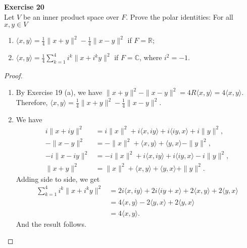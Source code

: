 \documentclass[12pt, a4paper]{article}
\theoremstyle{plain}
\newcommand{\R}{\mathbb{R}}
\newcommand{\C}{\mathbb{C}}
\newenvironment{exercise}[2][Exercise]
    { \begin{mdframed}[backgroundcolor=gray!20] \textbf{#1 #2} \\}
    {  \end{mdframed}}
\begin{document}
\begin{exercise}{20}
Let $V$ be an inner product space over $F$. Prove the polar identities: For all $x,y\in V$
\begin{enumerate}[label=(\alph*)]
\item $\langle{x,y}\rangle=\frac{1}{4}\|x+y\|^2-\frac{1}{4}\|x-y\|^2$ if $F=\R$;
\item $\langle{x,y}\rangle=\frac{1}{4}\sum_{k=1}^{4}{i^k\|x+i^ky\|^2}$ if $F=\C$, where $i^2=-1$.
\end{enumerate}
\end{exercise}
	\begin{proof}
	\hfill
	\begin{enumerate}[label=(\alph*)]
	\item By Exercise 19 (a), we have $\|x+y\|^2-\|x-y\|^2=4R\langle{x,y}\rangle=4\langle{x,y}\rangle$. Therefore, $\langle{x,y}\rangle=\frac{1}{4}\|x+y\|^2-\frac{1}{4}\|x-y\|^2$.
	\item We have 
	\begin{align*}
	i\|x+iy\|^2&=i\|x\|^2+i\langle{x,iy}\rangle+i\langle{iy,x}\rangle+i\|y\|^2,\\
	-\|x-y\|^2&=-\|x\|^2+\langle{x,y}\rangle+\langle{y,x}\rangle-\|y\|^2,\\
	-i\|x-iy\|^2&=-i\|x\|^2+i\langle{x,iy}\rangle+i\langle{iy,x}\rangle-i\|y\|^2,\\
	\|x+y\|^2&=\|x\|^2+\langle{x,y}\rangle+\langle{y,x}\rangle+\|y\|^2.
	\end{align*}
	Adding side to side, we get
	\begin{align*}
	\sum_{k=1}^{4}{i^k\|x+i^ky\|^2}&=2i\langle{x,iy}\rangle+2i\langle{iy+x}\rangle+2\langle{x,y}\rangle+2\langle{y,x}\rangle\\
	&= 4\langle{x,y}\rangle-2\langle{y,x}\rangle+2\langle{y,x}\rangle\\
	&= 4\langle{x,y}\rangle.
	\end{align*}
	And the result follows.
	\end{enumerate}
	\end{proof}
\end{document}
